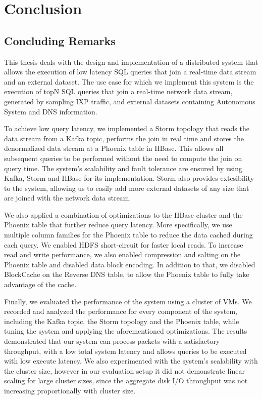 \chapter{Conclusion}\label{chapter:conclusion}

\section{Concluding Remarks}

This thesis deals with the design and implementation of a distributed system that allows the execution of low latency SQL queries that join a real-time data stream and an external dataset. The use case for which we implement this system is the execution of topN SQL queries that join a real-time network data stream, generated by sampling IXP traffic, and external datasets containing Autonomous System and DNS information. 

To achieve low query latency, we implemented a Storm topology that reads the data stream from a Kafka topic, performs the join in real time and stores the denormalized data stream at a Phoenix table in HBase. This allows all subsequent queries to be performed without the need to compute the join on query time. The system's scalability and fault tolerance are ensured by using Kafka, Storm and HBase for its implementation. Storm also provides extesibility to the system, allowing us to easily add more external datasets of any size that are joined with the network data stream.

We also applied a combination of optimizations to the HBase cluster and the Phoenix table that further reduce query latency. More specifically, we use multiple column families for the Phoenix table to reduce the data cached during each query. We enabled HDFS short-circuit for faster local reads. To increase read and write performance, we also enabled compression and salting on the Phoenix table and disabled data block encoding. In addition to that, we disabled BlockCache on the Reverse DNS table, to allow the Phoenix table to fully take advantage of the cache.

Finally, we evaluated the performance of the system using a cluster of VMs. We recorded and analyzed the performance for every component of the system, including the Kafka topic, the Storm topology and the Phoenix table, while tuning the system and applying the aforementioned optimizations. The results demonstrated that our system can process packets with a satisfactory throughput, with a low total system latency and allows queries to be executed with low execute latency. We also experimented with the system's scalability with the cluster size, however in our evaluation setup it did not demonstrate linear scaling for large cluster sizes, since the aggregate disk I/O throughput was not increasing proportionally with cluster size.


